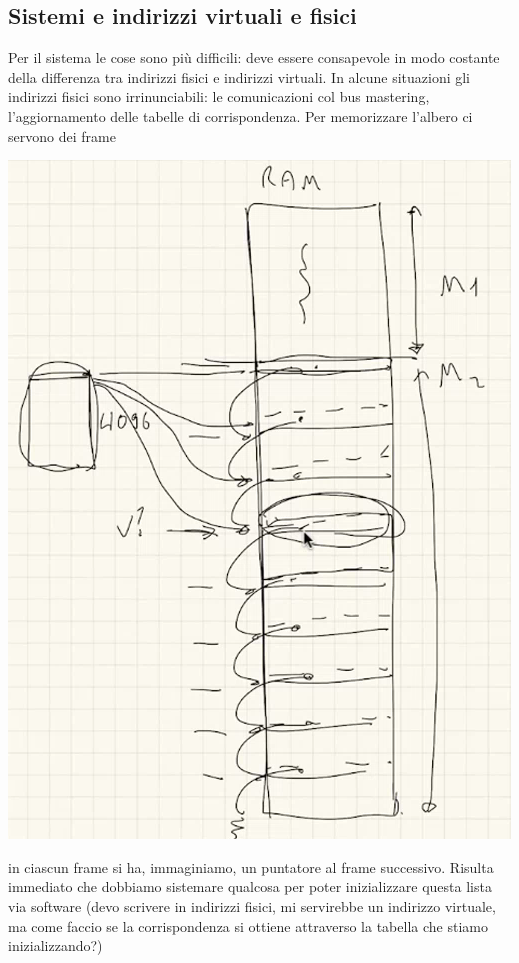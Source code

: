 \subsection{Sistemi e indirizzi virtuali e fisici}
Per il sistema le cose sono più difficili: deve essere consapevole in modo costante della differenza tra indirizzi fisici e indirizzi virtuali. In alcune situazioni gli indirizzi fisici sono irrinunciabili: le comunicazioni col bus mastering, l'aggiornamento delle tabelle di corrispondenza. Per memorizzare l'albero ci servono dei frame
\begin{center}
	\includegraphics[scale=.7]{img/217.PNG}
\end{center}
in ciascun frame si ha, immaginiamo, un puntatore al frame successivo. Risulta immediato che dobbiamo sistemare qualcosa per poter inizializzare questa lista via software (devo scrivere in indirizzi fisici, mi servirebbe un indirizzo virtuale, ma come faccio se la corrispondenza si ottiene attraverso la tabella che stiamo inizializzando?)

